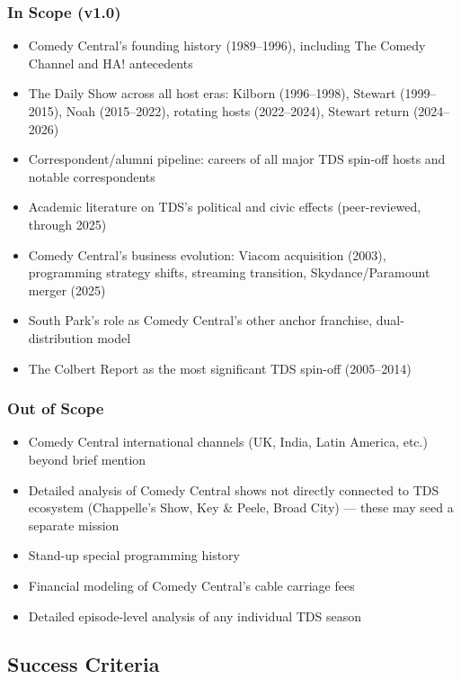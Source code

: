 \documentclass[11pt,letterpaper]{article}
\begin{document}
\subsubsection{In Scope (v1.0)}
\begin{itemize}[leftmargin=*]
  \item Comedy Central's founding history (1989--1996), including The Comedy Channel and HA! antecedents
  \item The Daily Show across all host eras: Kilborn (1996--1998), Stewart (1999--2015), Noah (2015--2022), rotating hosts (2022--2024), Stewart return (2024--2026)
  \item Correspondent/alumni pipeline: careers of all major TDS spin-off hosts and notable correspondents
  \item Academic literature on TDS's political and civic effects (peer-reviewed, through 2025)
  \item Comedy Central's business evolution: Viacom acquisition (2003), programming strategy shifts, streaming transition, Skydance/Paramount merger (2025)
  \item South Park's role as Comedy Central's other anchor franchise, dual-distribution model
  \item The Colbert Report as the most significant TDS spin-off (2005--2014)
\end{itemize}

\subsubsection{Out of Scope}
\begin{itemize}[leftmargin=*]
  \item Comedy Central international channels (UK, India, Latin America, etc.) beyond brief mention
  \item Detailed analysis of Comedy Central shows not directly connected to TDS ecosystem (Chappelle's Show, Key \& Peele, Broad City) --- these may seed a separate mission
  \item Stand-up special programming history
  \item Financial modeling of Comedy Central's cable carriage fees
  \item Detailed episode-level analysis of any individual TDS season
\end{itemize}

\subsection{Success Criteria}
\end{document}
